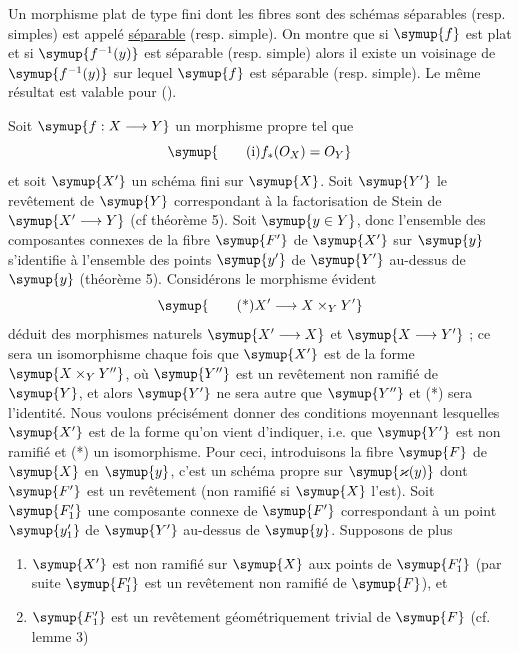  Un morphisme plat de type fini dont les fibres sont des
schémas séparables (resp. simples) est appelé \uline{séparable} (resp.
simple). On montre que si $\symup{f}$ est plat et si $\symup{f^{-1}(y)}$ est séparable
(resp. simple) alors il existe un voisinage de $\symup{f^{-1}(y)}$ sur lequel $\symup{f}$ est
séparable (resp. simple). Le même résultat est valable pour  (\uline{}).

Soit $\symup{f:X\longrightarrow Y}$ un morphisme propre tel que
\begin{equation}
  \symup{\tag{i}
  f_*(O_X)=O_Y}
\end{equation}
et soit $\symup{X'}$ un schéma fini sur $\symup{X}$. Soit $\symup{Y'}$ le revêtement de $\symup{Y}$
correspondant à la factorisation de Stein de $\symup{X'\longrightarrow Y}$
(cf théorème 5). Soit $\symup{y\in Y}$, donc l'ensemble des composantes connexes de la
fibre $\symup{F'}$ de $\symup{X'}$ sur $\symup{y}$ s'identifie à l'ensemble des points $\symup{y'}$ de $\symup{Y'}$
au-dessus de $\symup{y}$ (théorème 5). Considérons le morphisme évident
\begin{equation}
  \symup{\tag{*}
  X'\longrightarrow X\times_Y Y'}
\end{equation}
déduit des morphismes naturels $\symup{X'\longrightarrow X}$ et
$\symup{X\longrightarrow Y'}$ ; ce sera un isomorphisme chaque fois que $\symup{X'}$ est de
la forme $\symup{X\times_Y Y''}$, où $\symup{Y''}$ est un revêtement non ramifié de $\symup{Y}$, et
alors $\symup{Y'}$ ne sera autre que $\symup{Y''}$ et (*) sera l'identité. Nous voulons
précisément donner des conditions moyennant lesquelles $\symup{X'}$ est de la forme
qu'on vient d'indiquer, i.e. que $\symup{Y'}$ est non ramifié et (*) un isomorphisme.
Pour ceci, introduisons la fibre $\symup{F}$ de $\symup{X}$ en $\symup{y}$, c'est un schéma propre sur
$\symup{\varkappa(y)}$ dont $\symup{F'}$ est un revêtement (non ramifié si $\symup{X}$ l'est). Soit
$\symup{F'_1}$ une composante connexe de $\symup{F'}$ correspondant à un point $\symup{y'_1}$ de $\symup{Y'}$
au-dessus de $\symup{y}$. Supposons de plus
\begin{enumerate}
  \item[(ii)] $\symup{X'}$ est non ramifié sur $\symup{X}$ aux points de $\symup{F'_1}$ (par
    suite $\symup{F'_1}$ est un revêtement non ramifié de $\symup{F}$), et
  \item[(iii)] $\symup{F'_1}$ est un revêtement géométriquement trivial de
    $\symup{F}$ (cf. lemme 3)
\end{enumerate}


